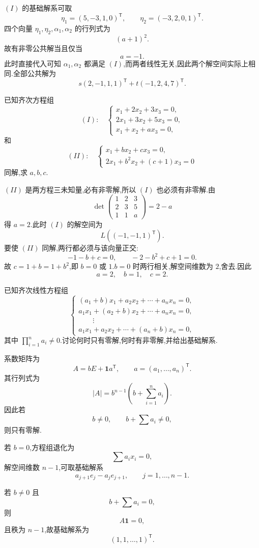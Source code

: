 \begin{solution}
$(I)$ 的基础解系可取
\[
\eta_1=(5,-3,1,0)^{\mathsf T},
\qquad
\eta_2=(-3,2,0,1)^{\mathsf T}.
\]
四个向量 $\eta_1,\eta_2,\alpha_1,\alpha_2$ 的行列式为
\[
(a+1)^2.
\]
故有非零公共解当且仅当
\[
\boxed{a=-1}.
\]
此时直接代入可知 $\alpha_1,\alpha_2$ 都满足 $(I)$,而两者线性无关,因此两个解空间实际上相同.全部公共解为
\[
\boxed{s(2,-1,1,1)^{\mathsf T}+t(-1,2,4,7)^{\mathsf T}}.
\]
\end{solution}

\begin{example}
已知齐次方程组
\[
(I):\quad
\begin{cases}
x_1+2x_2+3x_3=0,\\
2x_1+3x_2+5x_3=0,\\
x_1+x_2+ax_3=0,
\end{cases}
\]
和
\[
(II):\quad
\begin{cases}
x_1+bx_2+cx_3=0,\\
2x_1+b^2x_2+(c+1)x_3=0
\end{cases}
\]
同解,求 $a,b,c$.
\end{example}
\exampleblank

\begin{solution}
$(II)$ 是两方程三未知量,必有非零解,所以 $(I)$ 也必须有非零解.由
\[
\det
\begin{pmatrix}
1&2&3\\2&3&5\\1&1&a
\end{pmatrix}
=2-a
\]
得 $a=2$.此时 $(I)$ 的解空间为
\[
L((-1,-1,1)^{\mathsf T}).
\]
要使 $(II)$ 同解,两行都必须与该向量正交:
\[
-1-b+c=0,
\qquad
-2-b^2+c+1=0.
\]
故 $c=1+b=1+b^2$,即 $b=0$ 或 $1$.$b=0$ 时两行相关,解空间维数为 $2$,舍去.因此
\[
\boxed{a=2,\quad b=1,\quad c=2}.
\]
\end{solution}

\begin{example}
已知齐次线性方程组
\[
\begin{cases}
(a_1+b)x_1+a_2x_2+\cdots+a_nx_n=0,\\
a_1x_1+(a_2+b)x_2+\cdots+a_nx_n=0,\\
\qquad\vdots\\
a_1x_1+a_2x_2+\cdots+(a_n+b)x_n=0,
\end{cases}
\]
其中 $\displaystyle\prod_{i=1}^na_i\neq0$.讨论何时只有零解,何时有非零解,并给出基础解系.
\end{example}
\exampleblank

\begin{solution}
系数矩阵为
\[
A=bE+\boldsymbol{1}a^{\mathsf T},
\qquad
a=(a_1,\ldots,a_n)^{\mathsf T}.
\]
其行列式为
\[
|A|=b^{n-1}\left(b+\sum\limits_{i=1}^na_i\right).
\]
因此若
\[
b\neq0,
\qquad
b+\sum a_i\neq0,
\]
则只有零解.

若 $b=0$,方程组退化为
\[
\displaystyle\sum a_ix_i=0,
\]
解空间维数 $n-1$,可取基础解系
\[
a_{j+1}e_j-a_je_{j+1},
\qquad j=1,\ldots,n-1.
\]

若 $b\neq0$ 且
\[
b+\sum a_i=0,
\]
则
\[
A\boldsymbol{1}=0,
\]
且秩为 $n-1$,故基础解系为
\[
\boxed{(1,1,\ldots,1)^{\mathsf T}}.
\]
\end{solution}

